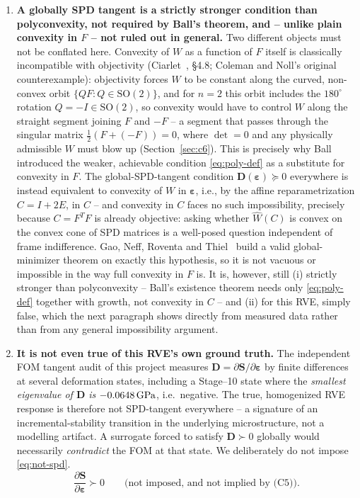 \documentclass[10pt,a4paper]{article}
\newcommand{\SO}{\mathrm{SO}(2)}
\begin{document}
\begin{enumerate}
\item \textbf{A globally SPD tangent is a strictly stronger condition
than polyconvexity, not required by Ball's theorem, and -- unlike plain
convexity in $F$ -- not ruled out in general.} Two different objects must
not be conflated here. Convexity of $W$ as a function of $F$ itself is
classically incompatible with objectivity (Ciarlet~\cite{Ciarlet1988},
\S4.8; Coleman and Noll's original counterexample): objectivity forces
$W$ to be constant along the curved, non-convex orbit $\{QF:Q\in\SO\}$,
and for $n=2$ this orbit includes the $180^\circ$ rotation $Q=-I\in\SO$,
so convexity would have to control $W$ along the straight segment joining
$F$ and $-F$ -- a segment that passes through the singular matrix
$\tfrac12(F+(-F))=0$, where $\det=0$ and any physically admissible $W$
must blow up (Section~\ref{sec:c6}). This is precisely why Ball introduced
the weaker, achievable condition \eqref{eq:poly-def} as a substitute for
convexity in $F$. The global-SPD-tangent condition $\bm D(\bm
\varepsilon)\succeq0$ everywhere is instead equivalent to convexity of
$W$ in $\bm\varepsilon$, i.e., by the affine reparametrization $C=I+2E$,
in $C$ -- and convexity in $C$ faces no such impossibility, precisely
because $C=F^TF$ is already objective: asking whether $\widehat W(C)$ is
convex on the convex cone of SPD matrices is a well-posed question
independent of frame indifference. Gao, Neff, Roventa and
Thiel~\cite{GaoNeffRoventaThiel2017} build a valid global-minimizer
theorem on exactly this hypothesis, so it is not vacuous or impossible in
the way full convexity in $F$ is. It is, however, still (i) strictly
stronger than polyconvexity -- Ball's existence theorem needs only
\eqref{eq:poly-def} together with growth, not convexity in $C$ -- and
(ii) for this RVE, simply false, which the next paragraph shows directly
from measured data rather than from any general impossibility argument.

\item \textbf{It is not even true of this RVE's own ground truth.} The
independent FOM tangent audit of this project measures
$\bm D=\partial\bm S/\partial\bm\varepsilon$ by finite differences at
several deformation states, including a Stage--10 state where the
\emph{smallest eigenvalue of $\bm D$ is $-0.0648\,\mathrm{GPa}$},
i.e.\ negative. The true, homogenized RVE response is therefore not
SPD-tangent everywhere -- a signature of an incremental-stability
transition in the underlying microstructure, not a modelling artifact.
A surrogate forced to satisfy $\bm D\succ0$ globally would necessarily
\emph{contradict} the FOM at that state. We deliberately do not impose
\eqref{eq:not-spd}.
\begin{equation}
 \frac{\partial\bm S}{\partial\bm\varepsilon}\succ0 \qquad\text{(not imposed, and not implied by (C5))}.
 \label{eq:not-spd}
\end{equation}
\end{enumerate}
\end{document}
